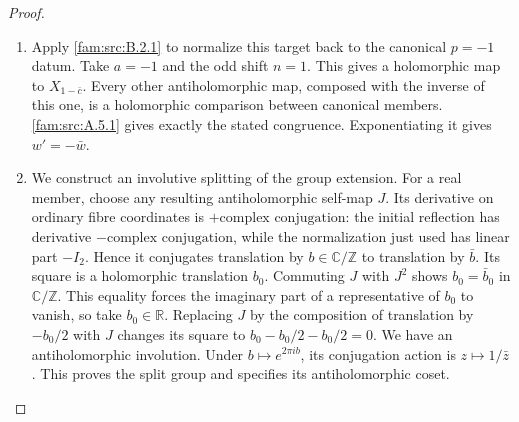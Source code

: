 \begin{proof}
\begin{enumerate}[label=\arabic*.,leftmargin=*]
\item Apply \ref{fam:src:B.2.1} to normalize this target back to the canonical $p=-1$ datum. Take $a=-1$ and the odd shift $n=1$. This gives a holomorphic map to $X_{1-\bar c}$. Every other antiholomorphic map, composed with the inverse of this one, is a holomorphic comparison between canonical members. \ref{fam:src:A.5.1} gives exactly the stated congruence. Exponentiating it gives $w'=-\bar w$.

\item We construct an involutive splitting of the group extension. For a real member, choose any resulting antiholomorphic self-map $J$. Its derivative on ordinary fibre coordinates is $+\text{complex conjugation}$: the initial reflection has derivative $-\text{complex conjugation}$, while the normalization just used has linear part $-I_2$. Hence it conjugates translation by $b\in\mathbb C/\mathbb Z$ to translation by $\bar b$. Its square is a holomorphic translation $b_0$. Commuting $J$ with $J^2$ shows $b_0=\bar b_0$ in $\mathbb C/\mathbb Z$. This equality forces the imaginary part of a representative of $b_0$ to vanish, so take $b_0\in\mathbb R$. Replacing $J$ by the composition of translation by $-b_0/2$ with $J$ changes its square to $b_0-b_0/2-b_0/2=0$. We have an antiholomorphic involution. Under $b\mapsto e^{2\pi ib}$, its conjugation action is $z\mapsto1/\bar z$. This proves the split group and specifies its antiholomorphic coset.
\end{enumerate}
\end{proof}